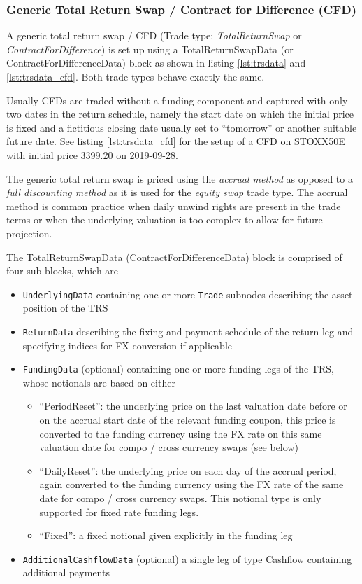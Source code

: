 \subsubsection{Generic Total Return Swap / Contract for Difference (CFD)}
\label{ss:GenericTRS}

A generic total return swap / CFD (Trade type: \emph{TotalReturnSwap} or \emph{ContractForDifference}) is set up using a
TotalReturnSwapData (or ContractForDifferenceData) block as shown in listing \ref{lst:trsdata} and
\ref{lst:trsdata_cfd}. Both trade types behave exactly the same.

Usually CFDs are traded without a funding component and captured with only two dates in the return schedule, namely the
start date on which the initial price is fixed and a fictitious closing date usually set to ``tomorrow'' or another
suitable future date. See listing \ref{lst:trsdata_cfd} for the setup of a CFD on STOXX50E with initial price 3399.20 on
2019-09-28.

The generic total return swap is priced using the {\em accrual method} as opposed to a {\em full discounting method} as
it is used for the {\em equity swap} trade type. The accrual method is common practice when daily unwind rights are
present in the trade terms or when the underlying valuation is too complex to allow for future projection.

The TotalReturnSwapData (ContractForDifferenceData) block is comprised of four sub-blocks, which are

\begin{itemize}
\item {\tt UnderlyingData} containing one or more {\tt Trade} subnodes describing the asset position of the TRS
\item {\tt ReturnData} describing the fixing and payment schedule of the return leg and specifying indices for FX conversion if applicable
\item {\tt FundingData} (optional) containing one or more funding legs of the TRS, whose notionals are based on either
  \begin{itemize}
    \item ``PeriodReset'': the underlying price on the last valuation date before or on the accrual start date of the relevant funding
      coupon, this price is converted to the funding currency using the FX rate on this same valuation date for compo /
      cross currency swaps (see below)
    \item ``DailyReset'': the underlying price on each day of the accrual period, again converted to the funding
      currency using the FX rate of the same date for compo / cross currency swaps. This notional type is only
      supported for fixed rate funding legs.
    \item ``Fixed'': a fixed notional given explicitly in the funding leg
  \end{itemize}

\item {\tt AdditionalCashflowData} (optional) a single leg of type Cashflow containing additional payments
\end{itemize}

